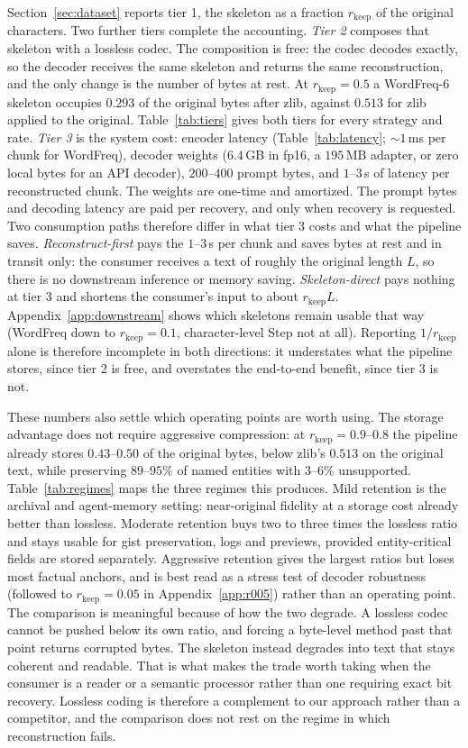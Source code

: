 \documentclass[11pt]{article}
\newcommand{\rkeep}{r_{\mathrm{keep}}}
\begin{document}
Section~\ref{sec:dataset} reports tier 1, the skeleton as a fraction $\rkeep$ of the original characters.
Two further tiers complete the accounting. \emph{Tier 2} composes that skeleton with a lossless codec. The
composition is free: the codec decodes exactly, so the decoder receives the same skeleton and returns the
same reconstruction, and the only change is the number of bytes at rest. At $\rkeep = 0.5$ a WordFreq-6
skeleton occupies $0.293$ of the original bytes after zlib, against $0.513$ for zlib applied to the original. Table~\ref{tab:tiers} gives both tiers for every strategy and rate. \emph{Tier 3} is the system cost: encoder latency (Table~\ref{tab:latency}; ${\sim}1$\,ms per chunk for
WordFreq), decoder weights ($6.4$\,GB in fp16, a $195$\,MB adapter, or zero local bytes for an API
decoder), $200$--$400$ prompt bytes, and $1$--$3$\,s of latency per reconstructed chunk. The weights are
one-time and amortized. The prompt bytes and decoding latency are paid per recovery, and only when recovery is
requested. Two consumption paths therefore differ in what tier 3 costs and what the pipeline saves.
\emph{Reconstruct-first} pays the $1$--$3$\,s per chunk and saves bytes at rest and in transit only: the
consumer receives a text of roughly the original length $L$, so there is no downstream inference or memory saving.
\emph{Skeleton-direct} pays nothing at tier 3 and shortens the consumer's input to about $\rkeep L$. Appendix~\ref{app:downstream} shows which skeletons remain usable that way (WordFreq down to
$\rkeep = 0.1$, character-level Step not at all). Reporting
$1/\rkeep$ alone is therefore incomplete in both directions: it understates what the pipeline stores, since tier
2 is free, and overstates the end-to-end benefit, since tier 3 is not.

These numbers also settle which operating points are worth using. The storage advantage does not require
aggressive compression: at $\rkeep = 0.9$--$0.8$ the pipeline already stores $0.43$--$0.50$ of the original
bytes, below zlib's $0.513$ on the original text, while preserving $89$--$95\%$ of named entities with
$3$--$6\%$ unsupported. Table~\ref{tab:regimes} maps the three regimes this produces. Mild retention is the
archival and agent-memory setting: near-original fidelity at a storage cost already better than lossless.
Moderate retention buys two to three times the lossless ratio and stays usable for gist preservation, logs
and previews, provided entity-critical fields are stored separately. Aggressive retention gives the largest
ratios but loses most factual anchors, and is best read as a stress test of decoder robustness (followed to $\rkeep = 0.05$ in Appendix~\ref{app:r005}) rather than
an operating point. The comparison is meaningful because of how the two degrade. A lossless codec cannot be pushed below its
own ratio, and forcing a byte-level method past that point returns corrupted bytes. The skeleton instead
degrades into text that stays coherent and readable. That is what makes the trade worth taking when the
consumer is a reader or a semantic processor rather than one requiring exact bit recovery. Lossless coding
is therefore a complement to our approach rather than a competitor, and the comparison does not rest on the
regime in which reconstruction fails.
\end{document}
